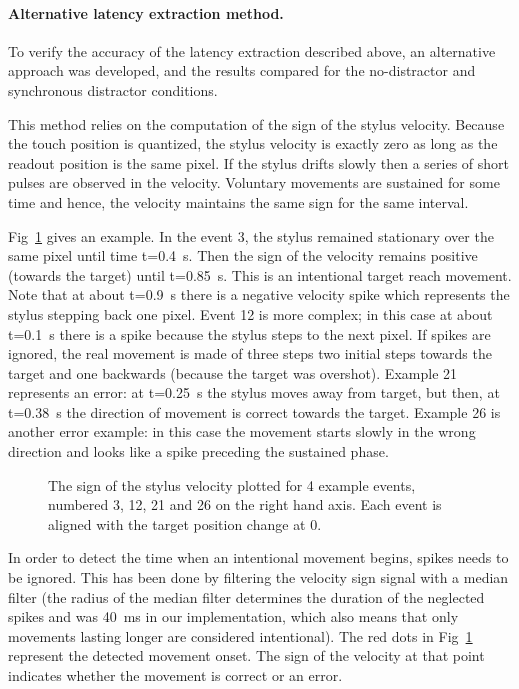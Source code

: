 \documentclass[10pt,letterpaper]{article}
\begin{document}
\paragraph{Alternative latency extraction method.}

To verify the accuracy of the latency extraction described above, an
alternative approach was developed, and the results compared for the
no-distractor and synchronous distractor conditions.

This method relies on the computation of the sign of the stylus
velocity. Because the touch position is quantized, the stylus velocity
is exactly zero as long as the readout position is the same pixel. If
the stylus drifts slowly then a series of short pulses are observed in
the velocity. Voluntary movements are sustained for some time and
hence, the velocity maintains the same sign for the same interval.

Fig~\ref{alt_method_move_dirn} gives an example. In the event 3, the
stylus remained stationary over the same pixel until time
t=0.4~s. Then the sign of the velocity remains positive (towards the
target) until t=0.85~s. This is an intentional target reach
movement. Note that at about t=0.9~s there is a negative velocity spike
which represents the stylus stepping back one pixel. Event 12 is more
complex; in this case at about t=0.1~s there is a spike because the
stylus steps to the next pixel. If spikes are ignored, the real
movement is made of three steps two initial steps towards the target
and one backwards (because the target was overshot). Example 21
represents an error: at t=0.25~s the stylus moves away from target,
but then, at t=0.38~s the direction of movement is correct towards the
target. Example 26 is another error example: in this case the movement
starts slowly in the wrong direction and looks like a spike preceding
the sustained phase.

\begin{figure}[htb!]
\centering
\caption[Alternative method] {The sign of the stylus velocity plotted
  for 4 example events, numbered 3, 12, 21 and 26 on the right hand
  axis. Each event is aligned with the target position change at 0.}
\label{alt_method_move_dirn}
\end{figure}

In order to detect the time when an intentional movement begins,
spikes needs to be ignored. This has been done by filtering the
velocity sign signal with a median filter (the radius of the median
filter determines the duration of the neglected spikes and was 40~ms
in our implementation, which also means that only movements lasting
longer are considered intentional). The red dots in
Fig~\ref{alt_method_move_dirn} represent the detected movement
onset. The sign of the velocity at that point indicates whether the
movement is correct or an error.
\end{document}
